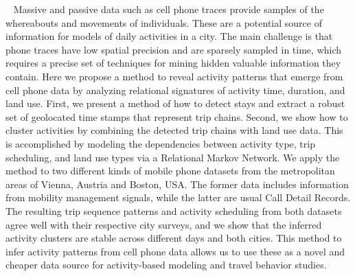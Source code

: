 ~\cite{widhalm2015discovering}
Massive and passive data such as cell phone traces provide samples of the whereabouts and movements of individuals. These are a potential source of information for models of daily activities in a city. The main challenge is that phone traces have low spatial precision and are sparsely sampled in time, which requires a precise set of techniques for mining hidden valuable information they contain. Here we propose a method to reveal activity patterns that emerge from cell phone data by analyzing relational signatures of activity time, duration, and land use. First, we present a method of how to detect stays and extract a robust set of geolocated time stamps that represent trip chains. Second, we show how to cluster activities by combining the detected trip chains with land use data. This is accomplished by modeling the dependencies between activity type, trip scheduling, and land use types via a Relational Markov Network. We apply the method to two different kinds of mobile phone datasets from the metropolitan areas of Vienna, Austria and Boston, USA. The former data includes information from mobility management signals, while the latter are usual Call Detail Records. The resulting trip sequence patterns and activity scheduling from both datasets agree well with their respective city surveys, and we show that the inferred activity clusters are stable across different days and both cities. This method to infer activity patterns from cell phone data allows us to use these as a novel and cheaper data source for activity-based modeling and travel behavior studies.

